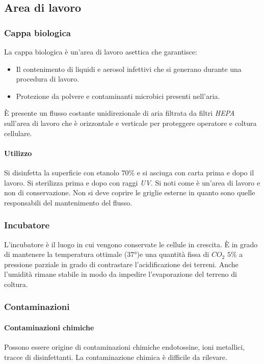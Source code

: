 	\subsection{Area di lavoro}

		\subsubsection{Cappa biologica}
		La cappa biologica \`e un'area di lavoro asettica che garantisce:
		\begin{itemize}
			\item Il contenimento di liquidi e aerosol infettivi che si generano durante una procedura di lavoro.
			\item Protezione da polvere e contaminanti microbici presenti nell'aria.
		\end{itemize}
		\`E presente un flusso costante unidirezionale di aria filtrata da filtri \emph{HEPA} sull'area di lavoro che \`e orizzontale e verticale per proteggere operatore e coltura cellulare.
			\paragraph{Utilizzo}
			Si disinfetta la superficie con etanolo $70\%$  e si asciuga con carta prima e dopo il lavoro.
			Si sterilizza prima e dopo con raggi \emph{UV}. 
			Si noti come \`e un'area di lavoro e non di conservazione.
			Non si deve coprire le griglie esterne in quanto sono quelle responsabili del mantenimento del flusso. 

		\subsubsection{Incubatore}
		L'incubatore \`e il luogo in cui vengono conservate le cellule in crescita.
		\`E in grado di mantenere la temperatura ottimale ($37\si{\degree}$)e una quantit\`a fissa di \emph{$CO_2$} $5\%$ a pressione parziale in grado di contrastare l'acidificazione dei terreni.
		Anche l'umidit\`a rimane stabile in modo da impedire l'evaporazione del terreno di coltura.

		\subsubsection{Contaminazioni}

			\paragraph{Contaminazioni chimiche}
			Possono essere origine di contaminazioni chimiche endotossine, ioni metallici, tracce di disinfettanti.
			La contaminazione chimica \`e difficile da rilevare.

